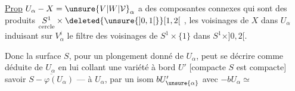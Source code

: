 \uline{Prop} $U_\alpha-X=\unsure{V|W|\mathcal V}_\alpha$ a des composantes connexes  qui sont des produits $\underset{\text{cercle}}{S^1}\times\deleted{\unsure{]0,1[}}[1,2[$  , les voisinages de $X$ dans $U_\alpha$ induisant sur $V_\alpha^i$ le filtre des voisinages de $S^1\times\{1\}$ dans $S^1\times]0,2[$.

\quad{}

Donc la surface $S$, pour un plongement donné de $U_\alpha$, peut se décrire comme  déduite de $U_\alpha$ en lui collant une variété  à bord $U'$ [compacte  $S$ est compacte]  savoir $\overline{S-\varphi(U_\alpha)}$ --- à $U_\alpha$, par un isom  $bU'_{\unsure{\alpha}}$ avec $-bU_\alpha\simeq$

